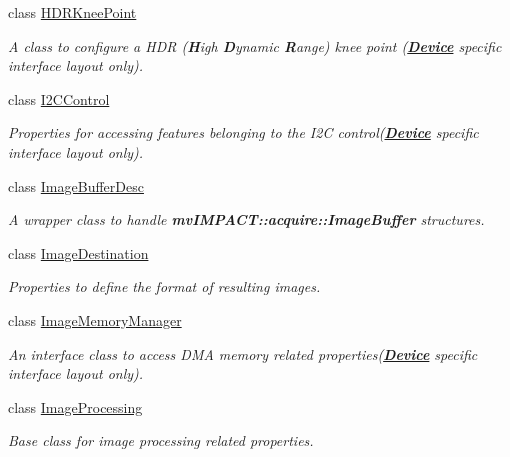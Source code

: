\begin{DoxyCompactItemize}
class \hyperlink{classmv_i_m_p_a_c_t_1_1acquire_1_1_h_d_r_knee_point}{H\+D\+R\+Knee\+Point}
\begin{DoxyCompactList}\small\item\em A class to configure a H\+D\+R ({\bfseries H}igh {\bfseries D}ynamic {\bfseries R}ange) knee point ({\bfseries \hyperlink{classmv_i_m_p_a_c_t_1_1acquire_1_1_device}{Device}} specific interface layout only). \end{DoxyCompactList}\item 
class \hyperlink{classmv_i_m_p_a_c_t_1_1acquire_1_1_i2_c_control}{I2\+C\+Control}
\begin{DoxyCompactList}\small\item\em Properties for accessing features belonging to the I2\+C control({\bfseries \hyperlink{classmv_i_m_p_a_c_t_1_1acquire_1_1_device}{Device}} specific interface layout only). \end{DoxyCompactList}\item 
class \hyperlink{classmv_i_m_p_a_c_t_1_1acquire_1_1_image_buffer_desc}{Image\+Buffer\+Desc}
\begin{DoxyCompactList}\small\item\em A wrapper class to handle {\bfseries mv\+I\+M\+P\+A\+C\+T\+::acquire\+::\+Image\+Buffer} structures. \end{DoxyCompactList}\item 
class \hyperlink{classmv_i_m_p_a_c_t_1_1acquire_1_1_image_destination}{Image\+Destination}
\begin{DoxyCompactList}\small\item\em Properties to define the format of resulting images. \end{DoxyCompactList}\item 
class \hyperlink{classmv_i_m_p_a_c_t_1_1acquire_1_1_image_memory_manager}{Image\+Memory\+Manager}
\begin{DoxyCompactList}\small\item\em An interface class to access D\+M\+A memory related properties({\bfseries \hyperlink{classmv_i_m_p_a_c_t_1_1acquire_1_1_device}{Device}} specific interface layout only). \end{DoxyCompactList}\item 
class \hyperlink{classmv_i_m_p_a_c_t_1_1acquire_1_1_image_processing}{Image\+Processing}
\begin{DoxyCompactList}\small\item\em Base class for image processing related properties. \end{DoxyCompactList}\item 

\end{DoxyCompactItemize}
